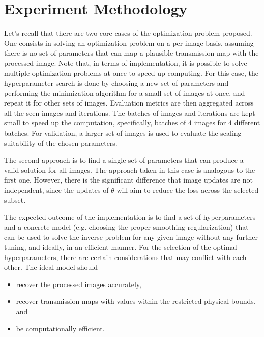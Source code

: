 \documentclass[nomenclature, english, bibtex]{kththesis}
\numberwithin{listing}{chapter}
\begin{document}
\section{Experiment Methodology}

Let's recall that there are two core cases of the optimization problem proposed. One consists in solving an optimization problem
on a per-image basis, assuming there is no set of parameters that can map a plausible transmission map with the processed image.
Note that, in terms of implementation, it is possible to solve multiple optimization problems at once to speed up computing.
For this case, the hyperparameter search is done by choosing a new set of parameters and performing the minimization algorithm
for a small set of images at once, and repeat it for other sets of images. Evaluation metrics are then aggregated across all the
seen images and iterations. The batches of images and iterations are kept small to speed up the computation, specifically,
batches of 4 images for 4 different batches. For validation, a larger set of images is used to evaluate the scaling suitability
of the chosen parameters.

The second approach is to find a single set of parameters that can produce a valid solution for all images.
The approach taken in this case is analogous to the first one. However, there is the significant difference that image
updates are not independent, since the updates of $\theta$ will aim to reduce the loss across the selected subset.

The expected outcome of the implementation is to find a set of hyperparameters and a concrete model (e.g. choosing the
proper smoothing regularization) that can be used to solve the inverse problem for any given image without any further tuning,
and ideally, in an efficient manner. For the selection of the optimal hyperparameters, there are certain considerations that may
conflict with each other. The ideal model should

\begin{itemize}
    \item recover the processed images accurately,
    \item recover transmission maps with values within the restricted physical bounds, and
    \item be computationally efficient.
\end{itemize}
\end{document}
